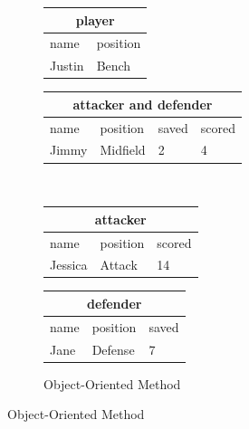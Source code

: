 \documentclass[a4paper]{article}
\begin{document}
\begin{itemize}
\begin{minipage}{0.7\linewidth}
\begin{figure}[H]
\vspace{2em}

\begin{subfigure}{\linewidth}
\centering
\begin{tabular}{ll}
\multicolumn{2}{c}{player}\\\toprule
name&position\\\midrule
Justin&Bench\\\bottomrule
\end{tabular}
\hfill
\begin{tabular}{llll}
\multicolumn{4}{c}{attacker and defender}\\\toprule
name&position&saved&scored\\\midrule
Jimmy&Midfield&2&4\\\bottomrule
\end{tabular}
\\
\vspace{1em}
\begin{tabular}{lll}
\multicolumn{3}{c}{attacker}\\\toprule
name&position&scored\\\midrule
Jessica&Attack&14\\\bottomrule
\end{tabular}
\hfill
\begin{tabular}{lll}
\multicolumn{3}{c}{defender}\\\toprule
name&position&saved\\\midrule
Jane&Defense&7\\\bottomrule
\end{tabular}
\caption*{Object-Oriented Method}
\end{subfigure}

\vspace{2em}


\end{figure}
\end{minipage}
\end{itemize}
\end{document}
